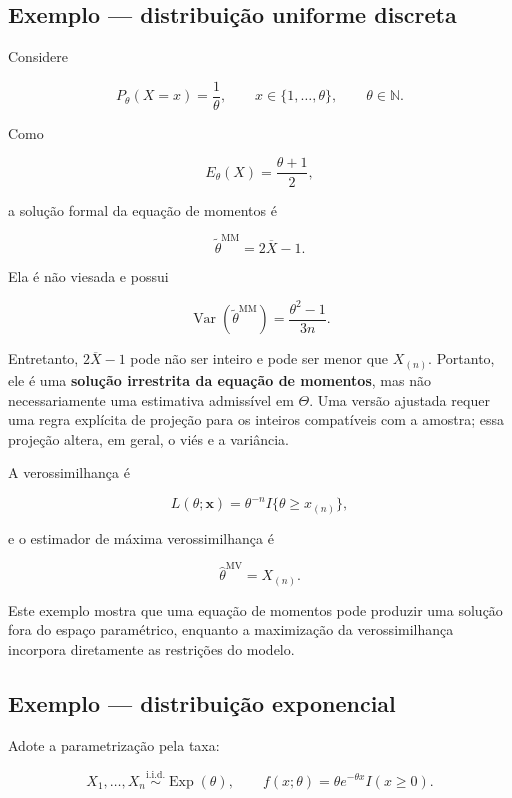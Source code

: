 \documentclass[
  letterpaper,
  DIV=11,
  numbers=noendperiod]{scrreprt}
\begin{document}
\subsection*{Exemplo --- distribuição uniforme
discreta}\label{exemplo-distribuiuxe7uxe3o-uniforme-discreta}

Considere

\[P_\theta(X=x)=\frac{1}{\theta},
\qquad x\in\{1,\ldots,\theta\},
\qquad\theta\in\mathbb{N}.\]

Como

\[E_\theta(X)=\frac{\theta+1}{2},\]

a solução formal da equação de momentos é

\[\widetilde\theta^{\mathrm{MM}}=2\overline X-1.\]

Ela é não viesada e possui

\[\operatorname{Var}(\widetilde\theta^{\mathrm{MM}})
=\frac{\theta^2-1}{3n}.\]

Entretanto, \(2\overline X-1\) pode não ser inteiro e pode ser menor que
\(X_{(n)}\). Portanto, ele é uma \textbf{solução irrestrita da equação
de momentos}, mas não necessariamente uma estimativa admissível em
\(\Theta\). Uma versão ajustada requer uma regra explícita de projeção
para os inteiros compatíveis com a amostra; essa projeção altera, em
geral, o viés e a variância.

A verossimilhança é

\[L(\theta;\boldsymbol x)
=\theta^{-n}I\{\theta\geq x_{(n)}\},\]

e o estimador de máxima verossimilhança é

\[\widehat\theta^{\mathrm{MV}}=X_{(n)}.\]

Este exemplo mostra que uma equação de momentos pode produzir uma
solução fora do espaço paramétrico, enquanto a maximização da
verossimilhança incorpora diretamente as restrições do modelo.

\subsection*{Exemplo --- distribuição
exponencial}\label{exemplo-distribuiuxe7uxe3o-exponencial}

Adote a parametrização pela taxa:

\[X_1,\ldots,X_n\overset{\mathrm{i.i.d.}}{\sim}\operatorname{Exp}(\theta),
\qquad
f(x;\theta)=\theta e^{-\theta x}I(x\geq0).\]
\end{document}
